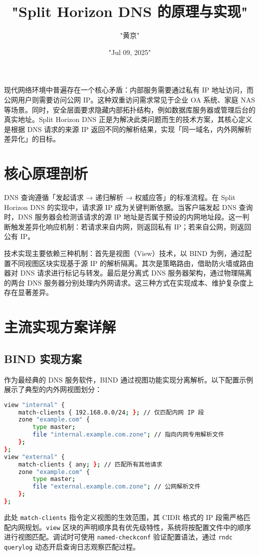 \title{"Split Horizon DNS 的原理与实现"}
\author{"黄京"}
\date{"Jul 09, 2025"}
\maketitle
现代网络环境中普遍存在一个核心矛盾：内部服务需要通过私有 IP 地址访问，而公网用户则需要访问公网 IP。这种双重访问需求常见于企业 OA 系统、家庭 NAS 等场景。同时，安全层面要求隐藏内部拓扑结构，例如数据库服务器或管理后台的真实地址。Split Horizon DNS 正是为解决此类问题而生的技术方案，其核心定义是根据 DNS 请求的来源 IP 返回不同的解析结果，实现「同一域名，内外网解析差异化」的目标。\par
\chapter{核心原理剖析}
DNS 查询遵循「发起请求 → 递归解析 → 权威应答」的标准流程。在 Split Horizon DNS 的实现中，请求源 IP 成为关键判断依据。当客户端发起 DNS 查询时，DNS 服务器会检测该请求的源 IP 地址是否属于预设的内网地址段。这一判断触发差异化响应机制：若请求来自内网，则返回私有 IP；若来自公网，则返回公有 IP。\par
技术实现主要依赖三种机制：首先是视图（View）技术，以 BIND 为例，通过配置不同视图区块实现基于源 IP 的解析隔离。其次是策略路由，借助防火墙或路由器对 DNS 请求进行标记与转发。最后是分离式 DNS 服务器架构，通过物理隔离的两台 DNS 服务器分别处理内外网请求。这三种方式在实现成本、维护复杂度上存在显著差异。\par
\chapter{主流实现方案详解}
\section{BIND 实现方案}
作为最经典的 DNS 服务软件，BIND 通过视图功能实现分离解析。以下配置示例展示了典型的内外网视图划分：\par
\begin{lstlisting}[language=bash]
view "internal" {
    match-clients { 192.168.0.0/24; }; // 仅匹配内网 IP 段
    zone "example.com" {
        type master;
        file "internal.example.com.zone"; // 指向内网专用解析文件
    };
};
view "external" {
    match-clients { any; }; // 匹配所有其他请求
    zone "example.com" {
        type master;
        file "external.example.com.zone"; // 公网解析文件
    };
};
\end{lstlisting}
此处 \texttt{match-clients} 指令定义视图的生效范围，其 CIDR 格式的 IP 段需严格匹配内网规划。\texttt{view} 区块的声明顺序具有优先级特性，系统将按配置文件中的顺序进行视图匹配。调试时可使用 \texttt{named-checkconf} 验证配置语法，通过 \texttt{rndc querylog} 动态开启查询日志观察匹配过程。\par
